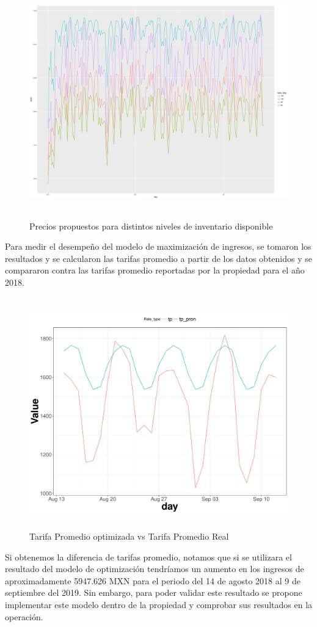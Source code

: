 \begin{figure}[H]
  \centering
      \includegraphics[width=\maxwidth,height=10cm]{figures/Pricing_graph-1}  
  \caption{Precios propuestos para distintos niveles de inventario disponible}
\end{figure}

Para medir el desempeño del modelo de maximización de ingresos, se tomaron los resultados y se calcularon las tarifas promedio a partir de los datos obtenidos y se compararon contra las tarifas promedio reportadas por la propiedad para el año 2018.

\begin{figure}[H]
  \centering
      \includegraphics[width=\maxwidth,height=10cm]{figures/Pricing-1}  
  \caption{Tarifa Promedio optimizada vs Tarifa Promedio Real}
\end{figure}


Si obtenemos la diferencia de tarifas promedio, notamos que si se utilizara el resultado del modelo de optimización tendríamos un aumento en los ingresos de aproximadamente 5947.626 MXN para el periodo del 14 de agosto 2018 al 9 de septiembre del 2019. Sin embargo, para poder validar este resultado se propone implementar este modelo dentro de la propiedad y comprobar sus resultados en la operación.




